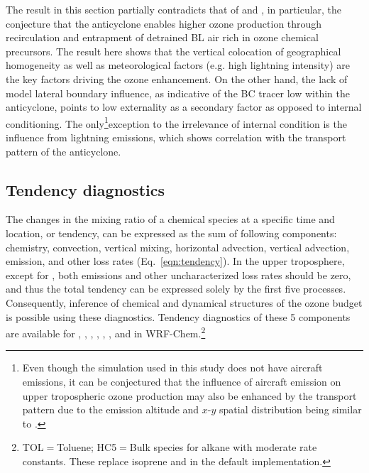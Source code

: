 The result in this section partially contradicts that of \citet{Li:2005ss} and \citet{Cooper:2007cr}, in particular, the conjecture that the anticyclone
enables higher ozone production through recirculation and entrapment of detrained BL air rich in ozone chemical precursors. The result here
shows that the vertical colocation of geographical homogeneity as well as meteorological factors (e.g. high lightning intensity) are the key factors
driving the ozone enhancement. On the other hand, the lack of model lateral boundary influence, as indicative of the BC tracer low within the
anticyclone, points to low externality as a secondary factor as opposed to internal conditioning. The only\footnote{Even though the simulation used
in this study does not have aircraft emissions, it can be conjectured that the influence of aircraft emission on upper tropospheric ozone production
may also be enhanced by the transport pattern due to the emission altitude and $x$-$y$ spatial distribution being similar to {\lnox}.}exception to
the irrelevance of internal condition is the influence from lightning emissions, which shows correlation with the transport pattern of the anticyclone.

\subsection{Tendency diagnostics}\label{ssec:2006/discuss/tendency}

The changes in the mixing ratio of a chemical species at a specific time and location, or tendency, can be expressed as
the sum of following components: chemistry, convection, vertical mixing, horizontal advection, vertical advection, emission,
and other loss rates (Eq.~\ref{eqn:tendency}). In the upper troposphere, except for , both emissions and other
uncharacterized loss rates should be zero, and thus the total tendency can be expressed solely by the first five processes.
Consequently, inference of chemical and dynamical structures of the ozone budget is possible using these diagnostics.
Tendency diagnostics of these 5 components are available for , , , , 
, , and  in WRF-Chem.\footnote{TOL$=$Toluene; HC5$=$Bulk species for alkane with moderate 
rate constants. These replace isoprene and  in the default implementation.}

